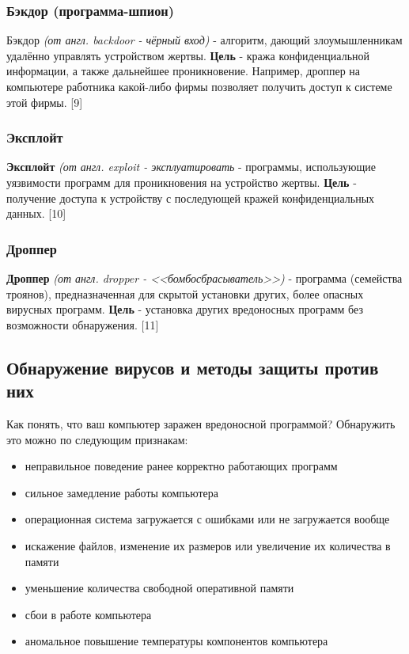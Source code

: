 \documentclass[12pt]{article}
\begin{document}
\subsubsection*{Бэкдор (программа-шпион)}
Бэкдор \textit{(от англ. backdoor - чёрный вход)} - алгоритм, дающий злоумышленникам удалённо управлять устройством жертвы. \textbf{Цель} - кража конфиденциальной информации, а также дальнейшее проникновение. Например, дроппер на компьютере работника какой-либо фирмы позволяет получить доступ к системе этой фирмы. [9]

\subsubsection*{Эксплойт}
\textbf{Эксплойт} \textit{(от англ. exploit - эксплуатировать} - программы, использующие уязвимости программ для проникновения на устройство жертвы. \textbf{Цель} - получение доступа к устройству с последующей кражей конфиденциальных данных. [10]

\subsubsection*{Дроппер}
\textbf{Дроппер} \textit{(от англ. dropper - <<бомбосбрасыватель>>)} - программа (семейства троянов), предназначенная для скрытой установки других, более опасных вирусных программ. \textbf{Цель} - установка других вредоносных программ без возможности обнаружения. [11]


\subsection*{Обнаружение вирусов и методы защиты против них}

Как понять, что ваш компьютер заражен вредоносной программой? 
Обнаружить это можно по следующим признакам:

\begin{itemize}
    \item неправильное поведение ранее корректно работающих программ
    \item сильное замедление работы компьютера
    \item операционная система загружается с ошибками или не загружается вообще
    \item искажение файлов, изменение их размеров или увеличение их количества в памяти
    \item уменьшение количества свободной оперативной памяти
    \item сбои в работе компьютера
    \item аномальное повышение температуры компонентов компьютера
\end{itemize}
\end{document}
